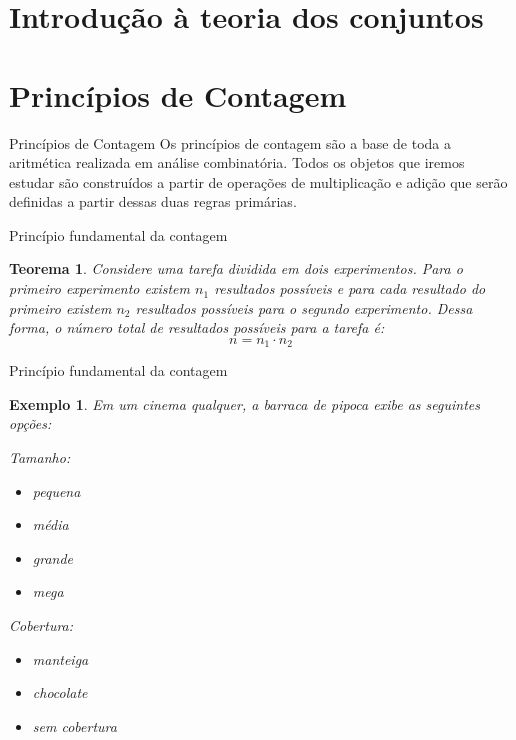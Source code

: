 \documentclass{beamer}
\author{Ismael Bastos}
\newtheorem{teorema}{Teorema}
\newtheorem{exemplo}{Exemplo}
\begin{document}
\section{Introdução à teoria dos conjuntos}
\section{Princípios de Contagem}
\begin{frame}{Princípios de Contagem}
 Os princípios de contagem são a base de toda a aritmética realizada em análise combinatória. Todos os objetos que iremos estudar são construídos a partir de operações de multiplicação e adição que serão definidas a partir dessas duas regras primárias.    
\end{frame}

\begin{frame}{Princípio fundamental da contagem}
    \begin{teorema}
        Considere uma tarefa dividida em dois experimentos. Para o primeiro experimento existem $n_1$ resultados possíveis e para cada resultado do primeiro existem $n_2$ resultados possíveis para o segundo experimento. Dessa forma, o número total de resultados possíveis para a tarefa é:
        $$n=n_1 \cdot n_2$$
    \end{teorema}    
\end{frame}

\begin{frame}{Princípio fundamental da contagem}
\begin{exemplo}
Em um cinema qualquer, a barraca de pipoca exibe as seguintes opções:
    \begin{multicols}{2}
        Tamanho:
        \begin{itemize}
        \item pequena
        \item média
        \item grande
        \item mega
        \end{itemize}
        
        \columnbreak
        
        Cobertura:
        \begin{itemize}
        \item manteiga
        \item chocolate
        \item sem cobertura
        \end{itemize}
    \end{multicols}
    
\end{exemplo}
\end{frame}
\end{document}
